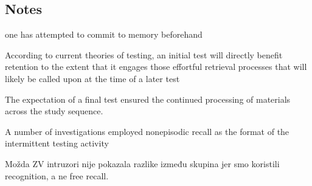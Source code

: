 \documentclass[../main.tex]{subfiles}
\begin{document}
{
    \biblio
}

\subsection{Notes}
one has attempted to commit to memory beforehand

According to current theories of testing, an initial test will directly benefit retention to the extent that it engages those effortful retrieval processes that will likely be called upon at the time of a later test \cite{roedigeriiiPowerTestingMemory2006}

The expectation of a final test ensured the
continued processing of materials across the study sequence.


A number of investigations employed nonepisodic recall as the format of the intermittent testing activity \cite{divisRetrievalSpeedsContext2014, pastotterRetrievalLearningFacilitates2011, }


Možda ZV intruzori nije pokazala razlike između skupina jer smo koristili recognition, a ne free recall.
\end{document}

